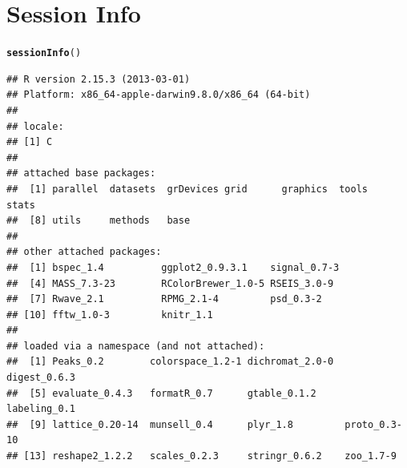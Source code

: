 \documentclass[10pt]{article}\usepackage{graphicx, color}
\makeatletter
\newcommand{\hlfunctioncall}[1]{\textcolor[rgb]{0.501960784313725,0,0.329411764705882}{\textbf{#1}}}%
\newenvironment{kframe}{%
 \def\at@end@of@kframe{}%
 \ifinner\ifhmode%
  \def\at@end@of@kframe{\end{minipage}}%
  \begin{minipage}{\columnwidth}%
 \fi\fi%
 \def\FrameCommand##1{\hskip\@totalleftmargin \hskip-\fboxsep
 \colorbox{shadecolor}{##1}\hskip-\fboxsep
     \hskip-\linewidth \hskip-\@totalleftmargin \hskip\columnwidth}%
 \MakeFramed {\advance\hsize-\width
   \@totalleftmargin\z@ \linewidth\hsize
   \@setminipage}}%
 {\par\unskip\endMakeFramed%
 \at@end@of@kframe}
\newenvironment{knitrout}{}{} %
\makeatother
\begin{document}
\section*{Session Info}
\begin{knitrout}
\color{fgcolor}\begin{kframe}
\begin{alltt}
\hlfunctioncall{sessionInfo}()
\end{alltt}
\begin{verbatim}
## R version 2.15.3 (2013-03-01)
## Platform: x86_64-apple-darwin9.8.0/x86_64 (64-bit)
## 
## locale:
## [1] C
## 
## attached base packages:
##  [1] parallel  datasets  grDevices grid      graphics  tools     stats    
##  [8] utils     methods   base     
## 
## other attached packages:
##  [1] bspec_1.4          ggplot2_0.9.3.1    signal_0.7-3      
##  [4] MASS_7.3-23        RColorBrewer_1.0-5 RSEIS_3.0-9       
##  [7] Rwave_2.1          RPMG_2.1-4         psd_0.3-2         
## [10] fftw_1.0-3         knitr_1.1         
## 
## loaded via a namespace (and not attached):
##  [1] Peaks_0.2        colorspace_1.2-1 dichromat_2.0-0  digest_0.6.3    
##  [5] evaluate_0.4.3   formatR_0.7      gtable_0.1.2     labeling_0.1    
##  [9] lattice_0.20-14  munsell_0.4      plyr_1.8         proto_0.3-10    
## [13] reshape2_1.2.2   scales_0.2.3     stringr_0.6.2    zoo_1.7-9
\end{verbatim}
\end{kframe}
\end{knitrout}



\end{document}
